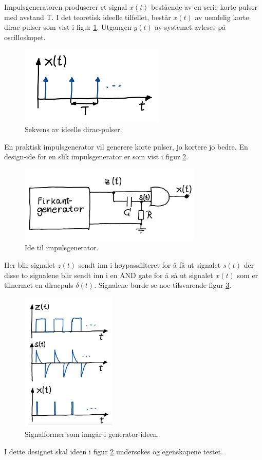 Impulsgeneratoren produserer et signal $x(t)$ bestående av en serie korte pulser med avstand T. I det teoretisk ideelle tilfellet, består $x(t)$ av uendelig korte dirac-pulser som vist i figur \ref{fig:03_problemstilling}. Utgangen $y(t)$ av systemet avleses på oscilloskopet. 

\begin{figure}[!hbt]
	\centering
	\includegraphics[scale=0.7]{./Images/01Issue/03.png}
	\caption{Sekvens av ideelle dirac-pulser.}
    \label{fig:03_problemstilling}
\end{figure}

En praktisk impulsgenerator vil generere korte pulser, jo kortere jo bedre. En design-ide for en slik impulsgenerator er som vist i figur \ref{fig:04_problemstilling}.

\begin{figure}[!hbt]
	\centering
	\includegraphics[scale=0.7]{./Images/01Issue/04.png}
	\caption{Ide til impulsgenerator.}
    \label{fig:04_problemstilling}
\end{figure}

Her blir signalet $z(t)$ sendt inn i høypassfilteret for å få ut signalet $s(t)$ der disse to signalene blir sendt inn i en AND gate for å så ut signalet $x(t)$ som er tilnermet en diracpuls $\delta (t)$. Signalene burde se noe tilsvarende figur \ref{fig:05_problemstilling}.

\begin{figure}[!hbt]
	\centering
	\includegraphics[scale=0.7]{./Images/01Issue/05.png}
	\caption{Signalformer som inngår i generator-ideen.}
    \label{fig:05_problemstilling}
\end{figure}

I dette designet skal ideen i figur \ref{fig:04_problemstilling} undersøkes og egenskapene testet.